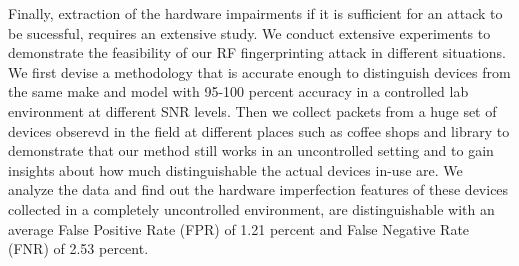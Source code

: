 

Finally, extraction of the hardware impairments if it is sufficient for an attack to be sucessful, requires
an extensive study. We conduct extensive experiments to demonstrate the feasibility of our 
RF fingerprinting attack in different situations. We first devise a methodology that is accurate 
enough to distinguish devices from the same make and model with 95-100 percent accuracy in a 
controlled lab environment at different SNR levels. Then we collect packets from a huge set of 
devices obserevd in the field at different places such as coffee shops and library to demonstrate
 that our method still works in an uncontrolled setting and to gain insights about how much 
 distinguishable the actual devices in-use are. We analyze the data and find out the hardware 
 imperfection features of these devices collected in a completely uncontrolled environment, 
 are distinguishable with an average False Positive Rate (FPR) of 1.21 percent and False Negative 
 Rate (FNR) of 2.53 percent. 

